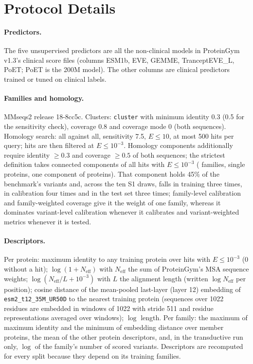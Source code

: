 \section{Protocol Details}\label{app:protocol}

\paragraph{Predictors.} The five unsupervised predictors are all the non-clinical models in ProteinGym v1.3's clinical score files (columns ESM1b, EVE, GEMME, TranceptEVE\_L, PoET; PoET is the 200M model). The other columns are clinical predictors trained or tuned on clinical labels.

\paragraph{Families and homology.} MMseqs2 release 18-8cc5c. Clusters: \texttt{cluster} with minimum identity 0.3 (0.5 for the sensitivity check), coverage 0.8 and coverage mode 0 (both sequences). Homology search: all against all, sensitivity 7.5, $E\le10$, at most 500 hits per query; hits are then filtered at $E\le10^{-3}$. Homology components additionally require identity $\ge0.3$ and coverage $\ge0.5$ of both sequences; the strictest definition takes connected components of all hits with $E\le10^{-3}$ (\nFamRemote{} families, \nFamRemoteSingleton{} single proteins, one component of \maxFamRemote{} proteins). That component holds 45\% of the benchmark's variants and, across the ten S1 draws, falls in training three times, in calibration four times and in the test set three times; family-level calibration and family-weighted coverage give it the weight of one family, whereas it dominates variant-level calibration whenever it calibrates and variant-weighted metrics whenever it is tested.

\paragraph{Descriptors.} Per protein: maximum identity to any training protein over hits with $E\le10^{-3}$ (0 without a hit); $\log(1+N_{\mathrm{eff}})$ with $N_{\mathrm{eff}}$ the sum of ProteinGym's MSA sequence weights; $\log(N_{\mathrm{eff}}/L+10^{-3})$ with $L$ the alignment length (written $\log N_{\mathrm{eff}}$ per position); cosine distance of the mean-pooled last-layer (layer 12) embedding of \texttt{esm2\_t12\_35M\_UR50D} to the nearest training protein (sequences over 1022 residues are embedded in windows of 1022 with stride 511 and residue representations averaged over windows); $\log$ length. Per family: the maximum of maximum identity and the minimum of embedding distance over member proteins, the mean of the other protein descriptors, and, in the transductive run only, $\log$ of the family's number of scored variants. Descriptors are recomputed for every split because they depend on its training families.

